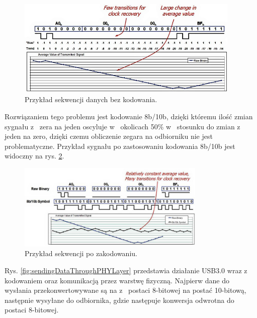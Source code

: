 \documentclass{BscUS}
\begin{document}
\begin{figure}[H]
\centering
\includegraphics[width=0.95\textwidth]{./img/withoutEncoding}
\caption{Przykład sekwencji danych bez kodowania. \cite{withoutEncoding}}
\label{fig:withoutEncoding}
\end{figure}
\noindent Rozwiązaniem tego problemu jest kodowanie 8b/10b, dzięki któremu ilość zmian sygnału z~ zera na jeden oscyluje w~ okolicach 50\% w~ stosunku do zmian z~ jeden na zero, dzięki czemu obliczenie zegara na odbiorniku nie jest problematyczne. Przykład sygnału po zastosowaniu kodowania 8b/10b jest widoczny na rys. \ref{fig:withEncoding}.
\begin{figure}[H]
\centering
\includegraphics[width=0.8\textwidth]{./img/withEncoding}
\caption{Przykład sekwencji po zakodowaniu. \cite{withEncoding}}
\label{fig:withEncoding}
\end{figure}
Rys. \ref{fig:sendingDataThroughPHYLayer} przedstawia działanie USB3.0 wraz z~ kodowaniem oraz komunikacją przez warstwę fizyczną. Najpierw dane do wysłania przekonwertowywane są na z~ postaci 8-bitowej na postać 10-bitową, następnie wysyłane do odbiornika, gdzie następuje konwersja odwrotna do postaci 8-bitowej.
\end{document}
